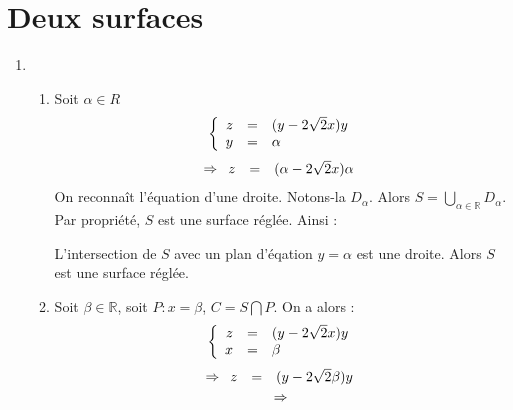 \section{Deux surfaces}
\begin{enumerate}
  \item \begin{enumerate}
          \item Soit $\alpha\in{R}$
                \[
                  \left\{
                  \begin{array}{r c l}
                    z & = & (y - 2\sqrt{2}x)y \\
                    y & = & \alpha            \\
                  \end{array}
                  \right.
                \]
                \[
                  \Rightarrow
                  \begin{array}{r c l}
                    z & = & (\alpha - 2\sqrt{2}x)\alpha \\
                  \end{array}
                \]
                On reconnaît l'équation d'une droite. Notons-la $D_\alpha$. Alors $S = \bigcup\limits_{\alpha\in\mathbb{R}}^{} D_\alpha$. Par propriété, $S$ est une surface réglée. Ainsi :
                \begin{result}
                  L'intersection de $S$ avec un plan d'éqation $y=\alpha$ est une droite.
                  Alors $S$ est une surface réglée.
                \end{result}
          \item
                Soit $\beta\in\mathbb{R}$, soit $P : x = \beta$, $C = S \bigcap P$.
                On a alors :
                \[
                  \left\{
                  \begin{array}{r c l}
                    z & = & (y - 2\sqrt{2}x)y \\
                    x & = & \beta             \\
                  \end{array}
                  \right.
                \]
                \[
                  \Rightarrow
                  \begin{array}{r c l}
                    z & = & (y - 2\sqrt{2}\beta)y \\
                  \end{array}
                \]
                \[
                  \Rightarrow
                  \begin{array}{r c l}

\end{array}\]
\end{enumerate}
\end{enumerate}
